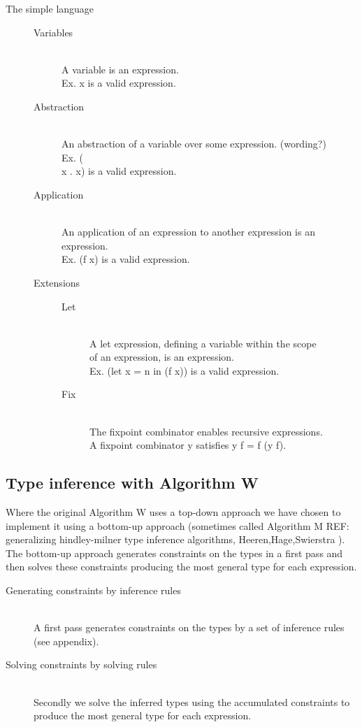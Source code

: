 \begin{description}
\item[The simple language] \hfill
\begin{description}
  \item[Variables] \hfill \\
    A variable is an expression.\\
    Ex. x is a valid expression.
   \item[Abstraction] \hfill \\
    An abstraction of a variable over some expression. (wording?)\\
    Ex. (\\x . x) is a valid expression.
   \item[Application] \hfill \\
    An application of an expression to another expression is an expression.\\
    Ex. (f x) is a valid expression.
   \item[Extensions] \hfill
\begin{description}
    \item[Let] \hfill \\
      A let expression, defining a variable within the scope\\
      of an expression, is an expression.\\
      Ex. (let x = n in (f x)) is a valid expression. 
    \item[Fix] \hfill \\
      The fixpoint combinator enables recursive expressions.\\
      A fixpoint combinator y satisfies y f = f (y f).
\end{description}
\end{description}
\end{description}

\subsection{Type inference with Algorithm W}

Where the original Algorithm W uses a top-down approach we have chosen to implement it using a bottom-up approach (sometimes called Algorithm M REF: generalizing hindley-milner type inference algorithms, Heeren,Hage,Swierstra ). The bottom-up approach generates constraints on the types in a first pass and then solves these constraints producing the most general type for each expression.

\begin{description}
  \item[Generating constraints by inference rules] \hfill \\
A first pass generates constraints on the types by a set of inference rules (see appendix). 
  \item[Solving constraints by solving rules] \hfill \\
Secondly we solve the inferred types using the accumulated constraints to produce the most general type for each expression. 
\end{description}
